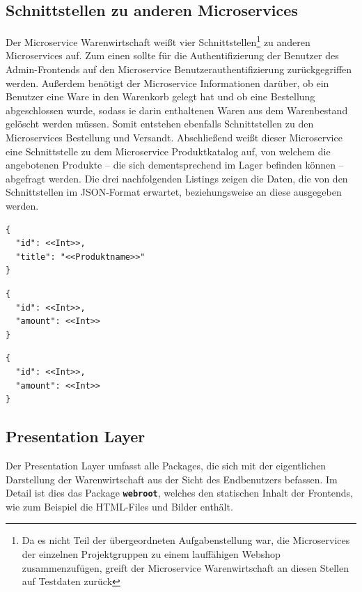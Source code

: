 \subsection{Schnittstellen zu anderen Microservices}
\label{subsec: Schnittstellen zu anderen Microservices}
Der Microservice Warenwirtschaft weißt vier Schnittstellen\footnote{Da es nicht Teil der übergeordneten Aufgabenstellung war, die Microservices der einzelnen Projektgruppen zu einem lauffähigen Webshop zusammenzufügen, greift der Microservice Warenwirtschaft an diesen Stellen auf Testdaten zurück} zu anderen Microservices auf. Zum einen sollte für die Authentifizierung der Benutzer des Admin-Frontends auf den Microservice Benutzerauthentifizierung zurückgegriffen werden. Außerdem benötigt der Microservice Informationen darüber, ob ein Benutzer eine Ware in den Warenkorb gelegt hat und ob eine Bestellung abgeschlossen wurde, sodass ie darin enthaltenen Waren aus dem Warenbestand gelöscht werden müssen. Somit entstehen ebenfalls Schnittstellen zu den Microservices Bestellung und Versandt. Abschließend weißt dieser Microservice eine Schnittstelle zu dem Microservice Produktkatalog auf, von welchem die angebotenen Produkte -- die sich dementsprechend im Lager befinden können -- abgefragt werden. Die drei nachfolgenden Listings zeigen die Daten, die von den Schnittstellen im JSON-Format erwartet, beziehungsweise an diese ausgegeben werden. 

\begin{lstlisting}[caption=Datenabfrage aus dem Produktkatalog]
{
  "id": <<Int>>,
  "title": "<<Produktname>>"
}
\end{lstlisting}


\begin{lstlisting}[caption=Datenabfrage von der Bestellung (Waren im Warenkorb abgelegt)]
{
  "id": <<Int>>,
  "amount": <<Int>>
}
\end{lstlisting}



\begin{lstlisting}[caption=Datenabfrage von der Bestellung (Waren wurden bestellt)]
{
  "id": <<Int>>,
  "amount": <<Int>>
}
\end{lstlisting}


\newpage
\subsection{Presentation Layer}
\label{subsec: Presentation Layer}
Der Presentation Layer umfasst alle  Packages, die sich mit der eigentlichen Darstellung der Warenwirtschaft aus der Sicht des Endbenutzers befassen. Im Detail ist dies das Package \textbf{\texttt{webroot}}, welches den statischen Inhalt der Frontends, wie zum Beispiel die HTML-Files und Bilder enthält.


